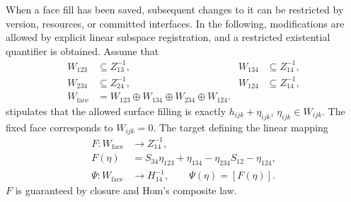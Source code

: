 \documentclass[12pt,a4paper,openany,notitlepage]{report}
\theoremstyle{plain}
\theoremstyle{definition}
\theoremstyle{remark}
\begin{document}
\begin{CJK*}
When a face fill has been saved, subsequent changes to it can be restricted by version, resources, or committed interfaces. In the following, modifications are allowed by explicit linear subspace registration, and a restricted existential quantifier is obtained. Assume that \[
 \begin{aligned}
 W_{123}&\subseteq Z^{-1}_{13},&
 W_{134}&\subseteq Z^{-1}_{14},\\
 W_{234}&\subseteq Z^{-1}_{24},&
 W_{124}&\subseteq Z^{-1}_{14},\\
 W_{\mathrm{face}}
 &=W_{123}\oplus W_{134}\oplus W_{234}\oplus W_{124}.
 \end{aligned}
\] stipulates that the allowed surface filling is exactly $h_{ijk}+\eta_{ijk}$, $\eta_{ijk}\in W_{ijk}$. The fixed face corresponds to $W_{ijk}=0$. The target defining the linear mapping \[
 \begin{aligned}
 F:W_{\mathrm{face}}&\longrightarrow Z^{-1}_{14},\\
 F(\eta)&=S_{34}\eta_{123}+\eta_{134}
          -\eta_{234}S_{12}-\eta_{124},\\
 \Psi:W_{\mathrm{face}}&\longrightarrow H^{-1}_{14},
 \qquad \Psi(\eta)=[F(\eta)].
 \end{aligned}
\] $F$ is guaranteed by closure and Hom's composite law.


\end{CJK*}
\end{document}
